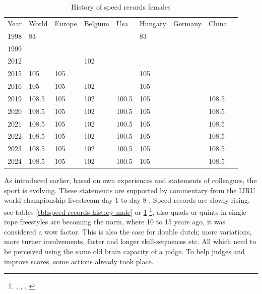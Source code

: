 \begin{table}[]
    \begin{tabular}{lllllllll}
        Year & World & Europe & Belgium & Usa   & Hungary & Germany & China \\
        1998 & 83    &        &         &       & 83      &         &       \\
        1999 &       &        &         &       &         &         &       \\
        2012 &       &        & 102     &       &         &         &       \\
        2015 & 105   & 105    &         &       & 105     &         &       \\
        2016 & 105   & 105    & 102     &       & 105     &         &       \\
        2019 & 108.5 & 105    & 102     & 100.5 & 105     &         & 108.5 \\
        2020 & 108.5 & 105    & 102     & 100.5 & 105     &         & 108.5 \\
        2021 & 108.5 & 105    & 102     & 100.5 & 105     &         & 108.5 \\
        2022 & 108.5 & 105    & 102     & 100.5 & 105     &         & 108.5 \\
        2023 & 108.5 & 105    & 102     & 100.5 & 105     &         & 108.5 \\
        2024 & 108.5 & 105    & 102     & 100.5 & 105     &         & 108.5
    \end{tabular}
    \caption{History of speed records females}
    \label{tbl:speed-records-history-female}
\end{table}

As introduced earlier, based on own experiences and statements of colleagues, the sport is evolving. These statements are supported by commentary from the IJRU world championship livestream day 1 \autocite{IJRU_yt_2023_livestream_day1} to day 8 \autocite{IJRU_yt_2023_livestream_day8}.
Speed records are slowly rising, see tables \ref{tbl:speed-records-history-male} or \ref{tbl:speed-records-history-female} \footnote{\autocite{www_speed_30s_1999_WORLD}, \autocite{www_speed_30s_2024_BE}, \autocite{www_speed_30s_2024_IJRU_WORLD}, \autocite{www_speed_30s_2024_USA_AMJRF}}, also quads or quints in single rope freestyles are becoming the norm, where 10 to 15 years ago, it was considered a wow factor. This is also the case for double dutch; more variations, more turner involvements, faster and longer skill-sequences etc.
All which need to be perceived using the same old brain capacity of a judge.
To help judges and improve scores, some actions already took place.

